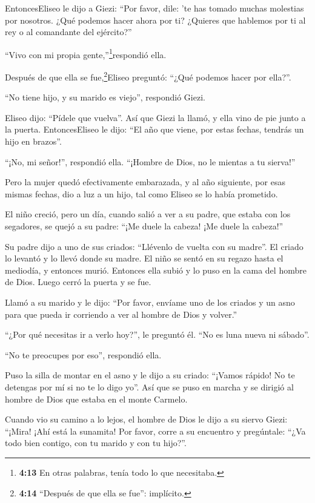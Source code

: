  EntoncesEliseo le dijo a Giezi: ``Por favor, dile: 'te has
tomado muchas molestias por nosotros. ¿Qué podemos hacer ahora por ti?
¿Quieres que hablemos por ti al rey o al comandante del ejército?''

``Vivo con mi propia gente,''\footnote{\textbf{4:13} En otras palabras,
  tenía todo lo que necesitaba.}respondió ella.

 Después de que ella se fue,\footnote{\textbf{4:14}
  ``Después de que ella se fue'': implícito.}Eliseo preguntó: ``¿Qué
podemos hacer por ella?''.

``No tiene hijo, y su marido es viejo'', respondió Giezi.

 Eliseo dijo: ``Pídele que vuelva''. Así que Giezi la
llamó, y ella vino de pie junto a la puerta. 
EntoncesEliseo le dijo: ``El año que viene, por estas fechas, tendrás un
hijo en brazos''.

``¡No, mi señor!'', respondió ella. ``¡Hombre de Dios, no le mientas a
tu sierva!''

 Pero la mujer quedó efectivamente embarazada, y al año
siguiente, por esas mismas fechas, dio a luz a un hijo, tal como Eliseo
se lo había prometido.

 El niño creció, pero un día, cuando salió a ver a su
padre, que estaba con los segadores,  se quejó a su padre:
``¡Me duele la cabeza! ¡Me duele la cabeza!''

Su padre dijo a uno de sus criados: ``Llévenlo de vuelta con su madre''.
 El criado lo levantó y lo llevó donde su madre. El niño se
sentó en su regazo hasta el mediodía, y entonces murió. 
Entonces ella subió y lo puso en la cama del hombre de Dios. Luego cerró
la puerta y se fue.

 Llamó a su marido y le dijo: ``Por favor, envíame uno de
los criados y un asno para que pueda ir corriendo a ver al hombre de
Dios y volver.''

 ``¿Por qué necesitas ir a verlo hoy?'', le preguntó él.
``No es luna nueva ni sábado''.

``No te preocupes por eso'', respondió ella.

 Puso la silla de montar en el asno y le dijo a su criado:
``¡Vamos rápido! No te detengas por mí si no te lo digo yo''.
 Así que se puso en marcha y se dirigió al hombre de Dios
que estaba en el monte Carmelo.

Cuando vio su camino a lo lejos, el hombre de Dios le dijo a su siervo
Giezi: ``¡Mira! ¡Ahí está la sunamita!  Por favor, corre a
su encuentro y pregúntale: ``¿Va todo bien contigo, con tu marido y con
tu hijo?''.

